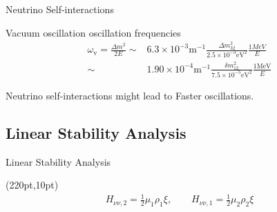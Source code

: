 \documentclass[9pt]{beamer}
\begin{document}
\begin{darkframes}
\begin{frame}{Neutrino Self-interactions}
\begin{tcolorbox}[title=Characteristic Length Scales]
   \end{tcolorbox}


\pause

Vacuum oscillation oscillation frequencies
   \begin{align*}
      \omega_{\mathrm v} = \frac{\Delta m^2}{2E}  \sim& 6.3\times 10^{-3} \mathrm{m}^{-1}  \frac{\Delta m^2_{32}}{2.5\times 10^{-3} \mathrm{eV}^2 } \frac{1MeV}{E} \\
   \sim & 1.90\times 10^{-4}  \mathrm{m}^{-1}  \frac{\delta m_{12}^2}{7.5\times 10^{-5}\mathrm{eV}^2} \frac{1\mathrm{MeV}}{E}
   \end{align*}

\pause

\begin{tcolorbox}
   Neutrino self-interactions might lead to Faster oscillations.
\end{tcolorbox}



\end{frame}



\subsection{Linear Stability Analysis}

\begin{frame}{Linear Stability Analysis}

   \begin{textblock*}{100pt}(220pt,10pt)
   \small
   \begin{align*}
      H_{\nu\nu,2} = \frac{1}{2}\mu_1 \rho_1 \xi , \qquad
      H_{\nu\nu,1} = \frac{1}{2}\mu_2 \rho_2 \xi
   \end{align*}
   \end{textblock*}


\begin{columns}[T]




\end{columns}
\end{frame}
\end{darkframes}
\end{document}
